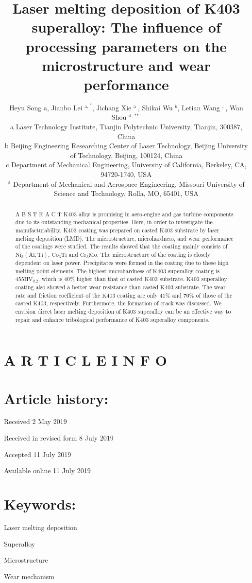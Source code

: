 \documentclass[10pt]{article}
\title{Laser melting deposition of K403 superalloy: The influence of processing parameters on the microstructure and wear performance }
\author{Heyu Song a, Jianbo Lei ${ }^{\text {a, }{ }^{*}}$, Jichang Xie ${ }^{\text {a }}$, Shikai Wu ${ }^{b}$, Letian Wang ${ }^{\text {, }}$, Wan Shou ${ }^{\text {d, ** }}$\\
a Laser Technology Institute, Tianjin Polytechnic University, Tianjin, 300387, China\\
b Beijing Engineering Researching Center of Laser Technology, Beijing University of Technology, Beijing, 100124, China\\
c Department of Mechanical Engineering, University of California, Berkeley, CA, 94720-1740, USA\\
${ }^{\mathrm{d}}$ Department of Mechanical and Aerospace Engineering, Missouri University of Science and Technology, Rolla, MO, 65401, USA}
\date{}
\begin{document}
\maketitle


\section*{A R T I C L E I N F O}
\section*{Article history:}
Received 2 May 2019

Received in revised form 8 July 2019

Accepted 11 July 2019

Available online 11 July 2019

\section*{Keywords:}
Laser melting deposition

Superalloy

Microstructure

Wear mechanism

\begin{abstract}
A B S T R A C T K403 alloy is promising in aero-engine and gas turbine components due to its outstanding mechanical properties. Here, in order to investigate the manufacturability, K403 coating was prepared on casted K403 substrate by laser melting deposition (LMD). The microstructure, microhardness, and wear performance of the coatings were studied. The results showed that the coating mainly consists of $\mathrm{Ni}_{3}(\mathrm{Al}, \mathrm{Ti})$, $\mathrm{Co}_{3} \mathrm{Ti}$ and $\mathrm{Cr}_{3} \mathrm{Mo}$. The microstructure of the coating is closely dependent on laser power. Precipitates were formed in the coating due to these high melting point elements. The highest microhardness of K403 superalloy coating is $455 \mathrm{HV}_{0.2}$, which is $40 \%$ higher than that of casted $\mathrm{K} 403$ substrate. $\mathrm{K} 403$ superalloy coating also showed a better wear resistance than casted $\mathrm{K} 403$ substrate. The wear rate and friction coefficient of the $\mathrm{K} 403$ coating are only $41 \%$ and $70 \%$ of those of the casted $\mathrm{K} 403$, respectively. Furthermore, the formation of crack was discussed. We envision direct laser melting deposition of K403 superalloy can be an effective way to repair and enhance tribological performance of K403 superalloy components.
\end{abstract}
\end{document}
